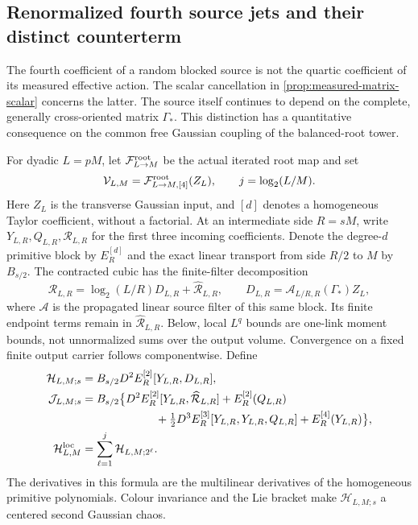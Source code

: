 \documentclass[11pt,oneside,openany]{book}
\theoremstyle{definition}
\theoremstyle{remark}
\begin{document}
\subsection{Renormalized fourth source jets and their distinct counterterm}
\label{sec:fourth-source-renormalization}
The fourth coefficient of a random blocked source is not the quartic
coefficient of its measured effective action. The scalar cancellation in
\cref{prop:measured-matrix-scalar} concerns the latter. The source itself
continues to depend on the complete, generally cross-oriented matrix
$\Gamma_*$. This distinction has a quantitative consequence on the common
free Gaussian coupling of the balanced-root tower.

For dyadic $L=pM$, let $\mathcal F^{\rm root}_{L\to M}$ be the actual
iterated root map and set
\[
 \mathcal V_{L,M}=\mathcal F^{\rm root}_{L\to M,[4]}(Z_L),
 \qquad j=\log_2(L/M).
\]
Here $Z_L$ is the transverse Gaussian input, and $[d]$ denotes a homogeneous
Taylor coefficient, without a factorial. At an intermediate side $R=sM$,
write $Y_{L,R},Q_{L,R},\mathcal R_{L,R}$ for the first three incoming
coefficients. Denote the degree-$d$ primitive block by $E_R^{[d]}$ and the
exact linear transport from side $R/2$ to $M$ by $B_{s/2}$. The contracted
cubic has the finite-filter decomposition
\begin{equation}
 \mathcal R_{L,R}=\log_2(L/R)D_{L,R}+\widehat{\mathcal R}_{L,R},
 \qquad D_{L,R}=\mathcal A_{L/R,R}(\Gamma_*)Z_L,
 \label{eq:source-cubic-finite-filter}
\end{equation}
where $\mathcal A$ is the propagated linear source filter of this same
block. Its finite endpoint terms remain in
$\widehat{\mathcal R}_{L,R}$. Below, local $L^q$ bounds are
one-link moment bounds, not unnormalized sums over the output volume.
Convergence on a fixed finite output carrier follows componentwise.
Define
\begin{align}
 \mathcal H_{L,M;s}
   &=B_{s/2}D^2E_R^{[2]}[Y_{L,R},D_{L,R}],\notag\\
 \mathcal J_{L,M;s}
   &=B_{s/2}\bigl\{
       D^2E_R^{[2]}[Y_{L,R},\widehat{\mathcal R}_{L,R}]
       +E_R^{[2]}(Q_{L,R})\notag\\
   &\hspace{23mm}+\tfrac12D^3E_R^{[3]}[Y_{L,R},Y_{L,R},Q_{L,R}]
       +E_R^{[4]}(Y_{L,R})\bigr\},\notag\\
 \mathcal H^{\rm loc}_{L,M}&=\sum_{\ell=1}^{j}\mathcal H_{L,M;2^\ell}.
 \label{eq:fourth-source-shells}
\end{align}
The derivatives in this formula are the multilinear derivatives of the
homogeneous primitive polynomials. Colour invariance and the Lie bracket
make $\mathcal H_{L,M;s}$ a centered second Gaussian chaos.
\end{document}
